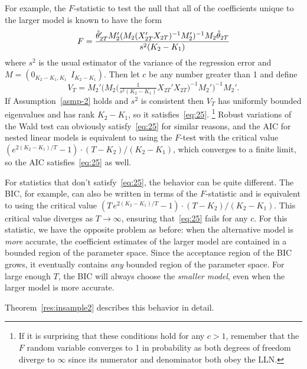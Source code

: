 \documentclass[12pt]{article}
\begin{document}
For example, the $F$-statistic to test the null that all of the
coefficients unique to the larger model is known to have the form
\begin{equation}\label{eq:17}
  F = \frac{\hat\theta_{2T}' M_2' ( M_2 (X_{2T}'X_{2T})^{-1} M_2' )^{-1} M_2
    \hat\theta_{2T}}{s^2 (K_2 - K_1)}
\end{equation}
where $s^2$ is the usual estimator of the variance of the regression
error and $M = (0_{K_2 - K_1, K_1}\ \ I_{K_2 - K_1})$. Then let $c$ be any number
greater than 1 and define
\begin{equation*}
  V_T = M_2' \big( M_2 \big(\tfrac{1}{s^2 (K_2 - K_1)} X_{2T}'X_{2T}\big)^{-1}
  M_2' \big)^{-1} M_2'.
\end{equation*}
If Assumption~\ref{asmp-2} holds and $s^2$ is consistent then $V_T$
has uniformly bounded eigenvalues and has rank $K_2 - K_1$, so it
satisfies~\eqref{eq:25}.%
\footnote{If it is surprising that these conditions hold for any $c >
  1$, remember that the $F$ random variable converges to 1 in
  probability as both degrees of freedom diverge to $\infty$ since its
  numerator and denominator both obey the LLN.} %
Robust variations of the Wald test can obviously satisfy~\eqref{eq:25}
for similar reasons, and the AIC for nested linear models is
equivalent to using the $F$-test with the critical value %
$(e^{2 (K_2 - K_1) / T} - 1) \cdot (T - K_2) / (K_2 - K_1)$, %
which converges to a finite limit, so the AIC satisfies~\eqref{eq:25}
as well.

For statistics that don't satisfy~\eqref{eq:25}, the behavior can be
quite different. The BIC, for example, can also be written in terms of
the $F$-statistic and is equivalent to using the critical value $(T \,
e^{2 (K_2 - K_1) / T} - 1) \cdot (T - K_2) / (K_2 - K_1)$. This
critical value diverges as $T \to \infty$, ensuring that~\eqref{eq:25}
fails for any $c$. For this statistic, we have the opposite problem as
before: when the alternative model is \emph{more} accurate, the
coefficient estimates of the larger model are contained in a bounded
region of the parameter space. Since the acceptance region of the BIC
grows, it eventually contains \emph{any} bounded region of the
parameter space. For large enough $T$, the BIC will always choose the
\emph{smaller model}, even when the larger model is more accurate.

Theorem~\ref{res:insample2} describes this behavior in detail.
\end{document}
